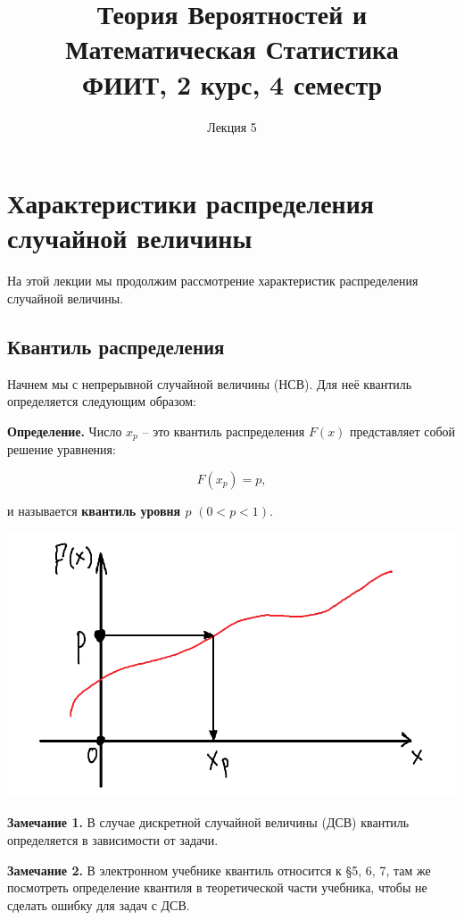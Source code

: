 \documentclass{article}
\title{Теория Вероятностей и Математическая Статистика\\
ФИИТ, 2 курс, 4 семестр}
\author{Лекция 5}
\begin{document}
\maketitle


\section{Характеристики распределения случайной величины}

На этой лекции мы продолжим рассмотрение характеристик распределения случайной величины.

\subsection{Квантиль распределения}

Начнем мы с непрерывной случайной величины (НСВ). Для неё квантиль определяется следующим образом:

\textbf{Определение.} Число $x_p$ -- это квантиль распределения $F(x)$ представляет собой решение уравнения:

$$F(x_p) = p,$$

и называется \textbf{квантиль уровня $p$} $(0 < p < 1)$.
\\

\begin{center}
    \includegraphics[scale=0.4]{1.png}
\end{center}

\textbf{Замечание 1.} В случае дискретной случайной величины (ДСВ) квантиль определяется в зависимости от задачи.

\textbf{Замечание 2.} В электронном учебнике квантиль относится к \S 5, 6, 7, там же посмотреть определение квантиля в теоретической части учебника, чтобы не сделать ошибку для задач с ДСВ.
 
\end{document}
